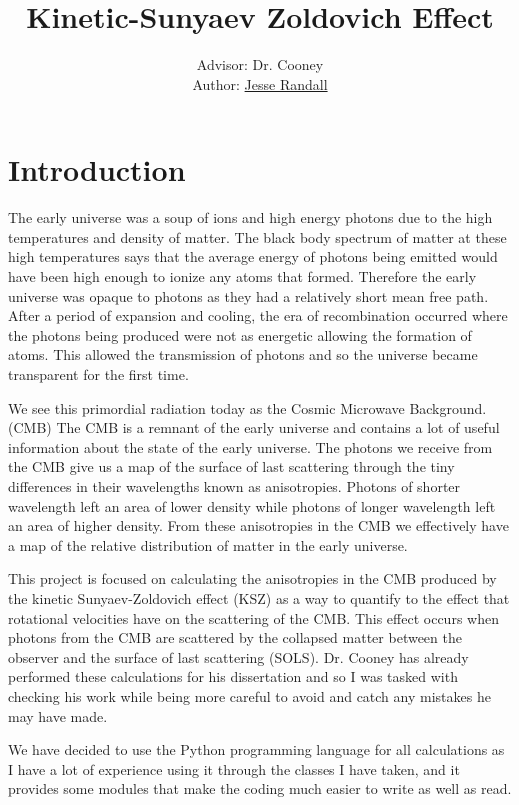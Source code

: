 \documentclass[12pt]{article}
\title{\vspace{-4ex} Kinetic-Sunyaev Zoldovich Effect \vspace{-1ex}}
\author{Advisor: Dr. Cooney \\
Author: \underline{Jesse Randall}\vspace{-2ex} \\
}
\begin{document}
\maketitle

\section{Introduction}

The early universe was a soup of ions and high energy photons due to the high temperatures and density of matter. The black body spectrum of matter at these high temperatures says that the average energy of photons being emitted would have been high enough to ionize any atoms that formed. Therefore the early universe was opaque to photons as they had a relatively short mean free path. After a period of expansion and cooling, the era of recombination occurred where the photons being produced were not as energetic allowing the formation of atoms. This allowed the transmission of photons and so the universe became transparent for the first time. 

We see this primordial radiation today as the Cosmic Microwave Background. (CMB) The CMB is a remnant of the early universe and contains a lot of useful information about the state of the early universe. The photons we receive from the CMB give us a map of the surface of last scattering through the tiny differences in their wavelengths known as anisotropies. Photons of shorter wavelength left an area of lower density while photons of longer wavelength left an area of higher density. From these anisotropies in the CMB we effectively have a map of the relative distribution of matter in the early universe.

This project is focused on calculating the anisotropies in the CMB produced by the kinetic Sunyaev-Zoldovich effect (KSZ) as a way to quantify to the effect that rotational velocities have on the scattering of the CMB. This effect occurs when photons from the CMB are scattered by the collapsed matter between the observer and the surface of last scattering (SOLS). Dr. Cooney has already performed these calculations for his dissertation and so I was tasked with checking his work while being more careful to avoid and catch any mistakes he may have made.

We have decided to use the Python programming language for all calculations as I have a lot of experience using it through the classes I have taken, and it provides some modules that make the coding much easier to write as well as read.
\end{document}
